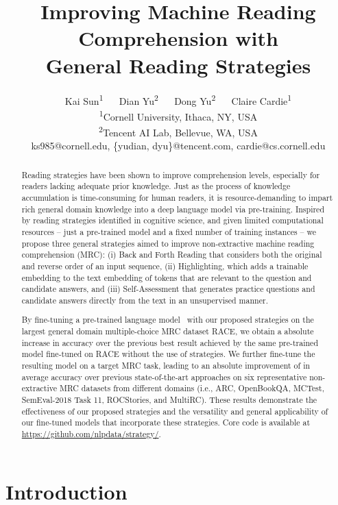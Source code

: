 \documentclass[11pt,a4paper]{article}
\title{Improving Machine Reading Comprehension with \\General Reading Strategies}
\author{
  Kai Sun\textsuperscript{1}\Thanks{This work was done when K. S. was an intern at the Tencent AI Lab, Bellevue, WA.}
  ~~ Dian Yu\textsuperscript{2} ~~ Dong Yu\textsuperscript{2} ~~ Claire Cardie\textsuperscript{1}\\
 \textsuperscript{1}Cornell University, Ithaca, NY, USA \\
 \textsuperscript{2}Tencent AI Lab, Bellevue, WA, USA\\
   ks985@cornell.edu, \{yudian, dyu\}@tencent.com, cardie@cs.cornell.edu \\
}
\date{}
\newcommand{\ie}{{i.e.}}
\begin{document}
\maketitle


\begin{abstract}

Reading strategies have been shown to improve comprehension levels, especially
for readers lacking adequate prior knowledge. Just as the process of knowledge accumulation is time-consuming for human readers, it is resource-demanding to impart rich general domain knowledge into a deep language model via pre-training. Inspired by reading strategies identified in cognitive science, and given limited computational resources -- just a pre-trained model and a fixed number of training instances -- we propose three general strategies aimed to improve non-extractive machine reading comprehension (MRC): (i) {\sc Back and Forth Reading} that considers both the original and reverse order of an input sequence, (ii) {\sc Highlighting}, which adds a trainable embedding to the text embedding of tokens that are relevant to the question and candidate answers, and (iii) {\sc Self-Assessment} that generates practice questions and candidate answers directly from the text in an unsupervised manner. 



By fine-tuning a pre-trained language model~\cite{radfordimproving} with our proposed strategies on the largest general domain multiple-choice MRC dataset RACE, we obtain a  absolute increase in accuracy over the previous best result achieved by the same pre-trained model fine-tuned on RACE without the use of strategies. We further fine-tune the resulting model on a target MRC task, leading to an absolute improvement of  in average accuracy over previous state-of-the-art approaches on six representative non-extractive MRC datasets from different domains (\ie, ARC, OpenBookQA, MCTest, SemEval-2018 Task 11, ROCStories, and MultiRC). These results demonstrate the effectiveness of our proposed strategies and the versatility and general applicability of our fine-tuned models that incorporate these strategies. Core code is available at \url{https://github.com/nlpdata/strategy/}.















\end{abstract} \section{Introduction}
\end{document}
